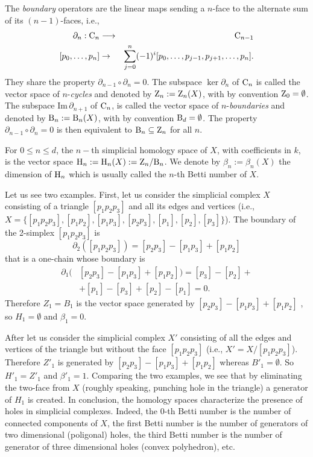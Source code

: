 \documentclass[preprintnumbers,showpacs, showkeys, twocolumn,secnumarabic,amssymb,amsmath,amsfonts,aps, pre]{revtex4-1}
\begin{document}
The \textit{boundary} operators are the linear maps sending a $n$-face to the alternate sum of its $(n-1)$-faces, i.e.,
\begin{eqnarray*}
\partial_n: \mathrm{C}_n & \longrightarrow & \mathrm{C}_{n-1}\\
\text{[}p_{0},\ldots, p_{n}\text{]} & \rightarrow & \sum_{j=0}^n(-1)^i\text{[}p_{0}, \ldots, p_{{j-1}}, p_{{j+1}},\ldots, p_{n}\text{]}.\\
\end{eqnarray*}
They share the property $\partial_{n-1}\circ\partial_n=0$. The subspace $\ker\partial_n$ of $\mathrm{C}_n$ is called the vector space of $n$-\textit{cycles} and denoted by $\mathrm{Z}_n:=\mathrm{Z}_n(X)$, with by convention $\mathrm{Z}_0 = \emptyset$.
The subspace  $\mathrm{Im}\,\partial_{n+1}$ of $\mathrm{C}_n$, is called the vector space of $n$-\textit{boundaries} and denoted by $\mathrm{B}_n:=\mathrm{B}_n(X)$, with by convention $\mathrm{B}_d = \emptyset$. The property $\partial_{n-1}\circ\partial_n=0$ is then equivalent to $\mathrm{B}_n\subseteq \mathrm{Z}_n$ for all $n$.
\begin{definition}
For $0 \leqslant n \leqslant d$, the $n-$th simplicial homology space of $X$, with coefficients in $k$, is the vector space $\mathrm{H}_n:=\mathrm{H}_n(X):=\mathrm{Z}_n/\mathrm{B}_n$.
We denote by $\beta_n:=\beta_n(X)$ the dimension of $\mathrm{H}_n$ which is usually called the $n$-th Betti number of $X$. 
\end{definition}
Let us see two examples.
First, let us consider the simplicial complex $X$ consisting of a triangle $[p_{1}p_{2}p_{3}]$ and all its edges and vertices (i.e., $X=\{[p_1p_2p_3],[p_1p_2],[p_1p_3],[p_2p_3],[p_1],[p_2],[p_3]\}$). The boundary of the 2-simplex $[p_{1}p_{2}p_{3}]$ is
$$\partial_2 ([p_{1}p_{2}p_{3}])=[p_{2}p_{3}]-[p_{1}p_{3}]+[p_{1}p_{2}]$$
that is a one-chain whose boundary is
\begin{eqnarray*}
\partial_1 ( &[p_{2}p_{3}]-[p_{1}p_{3}]+[p_{1}p_{2}]) =[p_{3}]-[p_{2}]+\\
&+[p_{1}]-[p_{3}]+[p_{2}]-[p_{1}] =0.
\end{eqnarray*}
Therefore $Z_1=B_1$ is the vector space generated by $[p_{2}p_{3}]-[p_{1}p_{3}]+[p_{1}p_{2}]$%
, so $H_1=\emptyset$ and $\beta_1=0$.

After let us consider the simplicial complex $X'$ consisting of all the edges and vertices of the triangle but without the face $[p_{1}p_{2}p_{3}]$ (i.e., $X' = X/[p_1p_2p_3]$). Therefore $Z'_1$ is generated by $[p_{2}p_{3}]-[p_{1}p_{3}]+[p_{1}p_{2}]$ whereas $B'_1=\emptyset$. So $H'_1=Z'_1$ and $\beta'_1=1$.
Comparing the two examples, we see that by eliminating the two-face from $X$ (roughly speaking, punching hole in the triangle) a generator of $H_1$ is created. In conclusion, the homology spaces characterize the presence of holes in simplicial complexes.
Indeed, the $0$-th Betti number is the number of connected components of $X$, the first Betti number is the number of generators of two dimensional (poligonal) holes, the third Betti number is the number of generator of three dimensional holes (convex polyhedron), etc.
\end{document}
